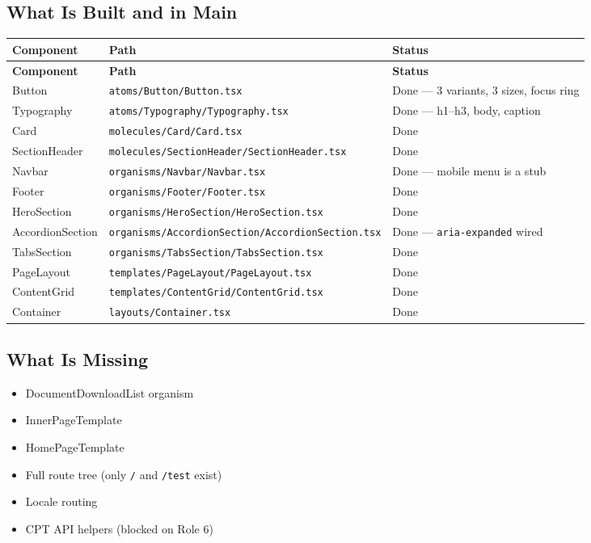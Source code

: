 \documentclass[12pt,a4paper]{article}
\begin{document}
\subsection{What Is Built and in Main}

\begin{longtable}{@{}llp{5cm}@{}}
\toprule
\rowcolor{uvtLightBlue}
\textbf{Component} & \textbf{Path} & \textbf{Status} \\
\midrule
\endfirsthead
\toprule
\rowcolor{uvtLightBlue}
\textbf{Component} & \textbf{Path} & \textbf{Status} \\
\midrule
\endhead
\bottomrule
\endfoot
Button & \texttt{atoms/Button/Button.tsx} & Done --- 3 variants, 3 sizes, focus ring \\
Typography & \texttt{atoms/Typography/Typography.tsx} & Done --- h1--h3, body, caption \\
Card & \texttt{molecules/Card/Card.tsx} & Done \\
SectionHeader & \texttt{molecules/SectionHeader/SectionHeader.tsx} & Done \\
Navbar & \texttt{organisms/Navbar/Navbar.tsx} & Done --- mobile menu is a stub \\
Footer & \texttt{organisms/Footer/Footer.tsx} & Done \\
HeroSection & \texttt{organisms/HeroSection/HeroSection.tsx} & Done \\
AccordionSection & \texttt{organisms/AccordionSection/AccordionSection.tsx} & Done --- \texttt{aria-expanded} wired \\
TabsSection & \texttt{organisms/TabsSection/TabsSection.tsx} & Done \\
PageLayout & \texttt{templates/PageLayout/PageLayout.tsx} & Done \\
ContentGrid & \texttt{templates/ContentGrid/ContentGrid.tsx} & Done \\
Container & \texttt{layouts/Container.tsx} & Done \\
\end{longtable}

\subsection{What Is Missing}

\begin{itemize}
    \item DocumentDownloadList organism
    \item InnerPageTemplate
    \item HomePageTemplate
    \item Full route tree (only \texttt{/} and \texttt{/test} exist)
    \item Locale routing
    \item CPT API helpers (blocked on Role 6)
\end{itemize}
\end{document}
